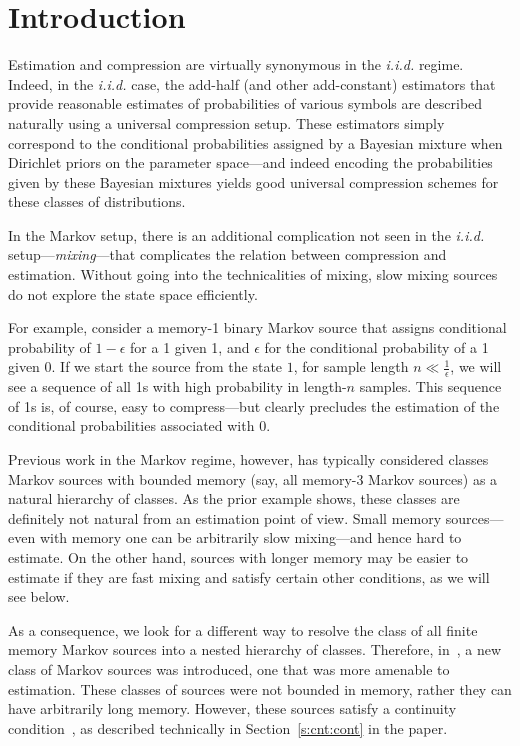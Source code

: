 \documentclass[conference,a4paper]{article}
\newcommand{\iid}{\emph{i.i.d.}\xspace}
\begin{document}
\section{Introduction}
Estimation and compression are virtually synonymous in the \iid
regime.  Indeed, in the \iid case, the add-half (and other
add-constant) estimators that provide reasonable estimates of
probabilities of various symbols are described naturally using
a universal compression setup. These estimators simply correspond to
the conditional probabilities assigned by a Bayesian mixture when
Dirichlet priors on the parameter space---and indeed encoding the
probabilities given by these Bayesian mixtures yields good
universal compression schemes for these classes of distributions.

In the Markov setup, there is an additional complication not seen
in the \iid setup---\emph{mixing}---that complicates the relation between
compression and estimation. Without going into the technicalities
of mixing, slow mixing sources do not explore the state space efficiently.

For example, consider a memory-1 binary Markov source that assigns
conditional probability of $1-\epsilon$ for a 1 given 1, and
$\epsilon$ for the conditional probability of a 1 given 0. If we start
the source from the state $1$, for sample length $n\ll\frac1\epsilon$,
we will see a sequence of all 1s with high probability in length-$n$
samples. This sequence of 1s is, of course, easy to compress---but
clearly precludes the estimation of the conditional probabilities
associated with 0. 

Previous work in the Markov regime, however, has typically considered
classes Markov sources with bounded memory (say, all memory-3 Markov
sources) as a natural hierarchy of classes. As the prior example
shows, these classes are definitely not natural from an estimation
point of view. Small memory sources---even with memory one can be
arbitrarily slow mixing---and hence hard to estimate. On the other
hand, sources with longer memory may be easier to estimate if they are
fast mixing and satisfy certain other conditions, as we will see
below. 

As a consequence, we look for a different way to resolve the class of
all finite memory Markov sources into a nested hierarchy of classes.
Therefore, in~\cite{asadi2014stationary}, a new class of Markov sources
was introduced, one that was more amenable to estimation. These
classes of sources were not bounded in memory, rather they can have
arbitrarily long memory.  However, these sources satisfy a continuity
condition~\cite{csiszar2006context,asadi2014stationary}, as described
technically in Section~\ref{s:cnt:cont} in the paper.  
\end{document}
